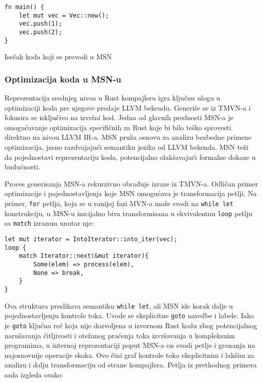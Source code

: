 \begin{listing}[H]
\begin{verbatim}
fn main() {
    let mut vec = Vec::new();
    vec.push(1);
    vec.push(2);
}
\end{verbatim}
\caption{Isečak koda koji se prevodi u MSN}
\label{lst:snippet-before-mir}
\end{listing}

\subsubsection{Optimizacija koda u MSN-u}

Reprezentacija srednjeg nivoa u Rust kompajleru igra ključnu ulogu u optimizaciji koda pre njegove predaje LLVM bekendu. 
Generiše se iz TMVN-a i fokusira se isključivo na izvršni kod. Jedna od glavnih prednosti MSN-a je omogućavanje optimizacija specifičnih za Rust koje bi bilo teško 
sprovesti direktno na nivou LLVM IR-a. MSN pruža osnovu za analizu bezbedne primene optimizacija, 
jasno razdvajajući semantiku jezika od LLVM bekenda. MSN teži da pojednostavi reprezentaciju koda, potencijalno olakšavajući formalne dokaze u budućnosti.

Proces generisanja MSN-a rekurzivno obrađuje izraze iz TMVN-a. Odličan primer optimizacije i pojednostavljenja koje MSN omogućava je 
transformacija petlji. Na primer, \verb|for| petlja, koja se u ranijoj fazi MVN-a može svodi na \verb|while let| konstrukciju,
u MSN-u inicijalno biva transformisana u ekvivalentnu \verb|loop| petlju sa \verb|match| izrazom unutar nje:

\begin{verbatim}
let mut iterator = IntoIterator::into_iter(vec);
loop {
    match Iterator::next(&mut iterator){
        Some(elem) => process(elem),
        None => break,
    }
}
\end{verbatim}

Ova struktura preslikava semantiku \verb|while let|, ali MSN ide korak dalje u pojednostavljenju kontrole toka. Uvode se eksplicitne \verb|goto| 
naredbe i labele. Iako je \verb|goto| ključna reč koja nije dozvoljena u izvornom Rust kodu zbog potencijalnog narušavanja čitljivosti i 
otežanog praćenja toka izvršavanja u kompleksnim programima, u internoj reprezentaciji poput MSN-a on svodi petlje i grananja na najosnovnije 
operacije skoka. Ovo čini graf kontrole toka eksplicitnim i lakšim za analizu i dalju transformaciju od strane kompajlera. 
Petlja iz prethodnog primera sada izgleda ovako:

